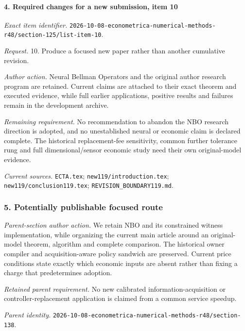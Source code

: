 \paragraph{4. Required changes for a new submission, item 10}

\emph{Exact item identifier.} \nolinkurl{2026-10-08-econometrica-numerical-methods-r48/section-125/list-item-10}.

\par\emph{Request.} 10. Produce a focused new paper rather than another cumulative revision.

\par\emph{Author action.} Neural Bellman Operators and the original author research program are retained. Current claims are attached to their exact theorem and executed evidence, while full earlier applications, positive results and failures remain in the development archive.

\par\emph{Remaining requirement.} No recommendation to abandon the NBO research direction is adopted, and no unestablished neural or economic claim is declared complete. The historical replacement-fee sensitivity, common further tolerance rung and full dimensional/\allowbreak{}sensor economic study need their own original-model evidence.

\par\emph{Current sources.} \nolinkurl{ECTA.tex}; \nolinkurl{new119/introduction.tex}; \nolinkurl{new119/conclusion119.tex}; \nolinkurl{REVISION_BOUNDARY119.md}.

\subsubsection{5. Potentially publishable focused route}

\emph{Parent-section author action.} We retain NBO and its constrained witness implementation, while organizing the current main article around an original-model theorem, algorithm and complete comparison. The historical owner compiler and acquisition-aware policy sandwich are preserved. Current price conditions state exactly which economic inputs are absent rather than fixing a charge that predetermines adoption.

\par\emph{Retained parent requirement.} No new calibrated information-acquisition or controller-replacement application is claimed from a common service speedup.

\par\emph{Parent identity.} \nolinkurl{2026-10-08-econometrica-numerical-methods-r48/section-138}.

